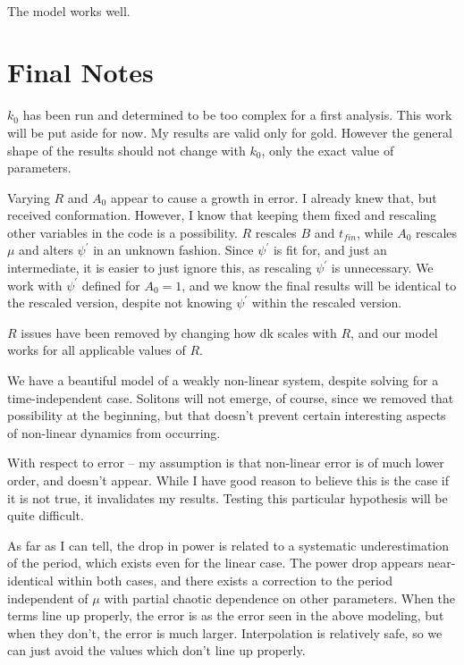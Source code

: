 \documentclass[11pt]{article}
\begin{document}
    \begin{center}
    \end{center}
    { \hspace*{\fill} \\}
    
    The model works well.

    \hypertarget{final-notes}{%
\section{Final Notes}\label{final-notes}}

    \(k_0\) has been run and determined to be too complex for a first
analysis. This work will be put aside for now. My results are valid only
for gold. However the general shape of the results should not change
with \(k_0\), only the exact value of parameters.

Varying \(R\) and \(A_0\) appear to cause a growth in error. I already
knew that, but received conformation. However, I know that keeping them
fixed and rescaling other variables in the code is a possibility. \(R\)
rescales \(B\) and \(t_{fin}\), while \(A_0\) rescales \(\mu\) and
alters \(\psi^\prime\) in an unknown fashion. Since \(\psi^\prime\) is
fit for, and just an intermediate, it is easier to just ignore this, as
rescaling \(\psi^\prime\) is unnecessary. We work with \(\psi^\prime\)
defined for \(A_0 = 1\), and we know the final results will be identical
to the rescaled version, despite not knowing \(\psi^\prime\) within the
rescaled version.

\(R\) issues have been removed by changing how dk scales with \(R\), and
our model works for all applicable values of \(R\).

    We have a beautiful model of a weakly non-linear system, despite solving
for a time-independent case. Solitons will not emerge, of course, since
we removed that possibility at the beginning, but that doesn't prevent
certain interesting aspects of non-linear dynamics from occurring.

    With respect to error -- my assumption is that non-linear error is of
much lower order, and doesn't appear. While I have good reason to
believe this is the case if it is not true, it invalidates my results.
Testing this particular hypothesis will be quite difficult.

As far as I can tell, the drop in power is related to a systematic
underestimation of the period, which exists even for the linear case.
The power drop appears near-identical within both cases, and there
exists a correction to the period independent of \(\mu\) with partial
chaotic dependence on other parameters. When the terms line up properly,
the error is as the error seen in the above modeling, but when they
don't, the error is much larger. Interpolation is relatively safe, so we
can just avoid the values which don't line up properly.

    


    
    
    
\end{document}
